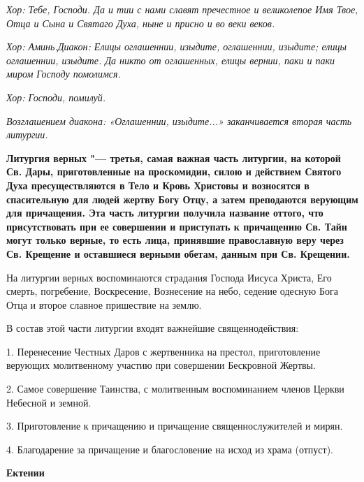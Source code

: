 \itshape Хор:\normalfont{} Тебе, Господи. Да и тии с нами славят пречестное и великолепое Имя Твое, Отца и Сына и Святаго Духа, ныне и присно и во веки веков.


\itshape Хор:\normalfont{} Аминь.\itshape  Диакон:\normalfont{} Елицы оглашеннии, изыдите, оглашеннии, изыдите; елицы оглашеннии, изыдите. Да никто от оглашенных, елицы вернии, паки и паки миром Господу помолимся.


\itshape Хор:\normalfont{} Господи, помилуй.


\itshape Возглашением диакона: «Оглашеннии, изыдите...» заканчивается вторая часть литургии.\normalfont{}

\mychapterending

 


\bfseries Литургия верных\normalfont{} "--- третья, самая важная часть литургии, на которой Св. Дары, приготовленные на проскомидии, силою и действием Святого Духа пресуществляются в Тело и Кровь Христовы и возносятся в спасительную для людей жертву Богу Отцу, а затем преподаются верующим для причащения. Эта часть литургии получила название оттого, что присутствовать при ее совершении и приступать к причащению Св. Тайн могут только верные, то есть лица, принявшие православную веру через Св. Крещение и оставшиеся верными обетам, данным при Св. Крещении.



  На литургии верных воспоминаются страдания Господа Иисуса Христа, Его смерть, погребение, Воскресение, Вознесение на небо, седение одесную Бога Отца и второе славное пришествие на землю.


\medskip


В состав этой части литургии входят важнейшие священнодействия:


  1. Перенесение Честных Даров с жертвенника на престол, приготовление верующих молитвенному участию при совершении Бескровной Жертвы.


  2. Самое совершение Таинства, с молитвенным воспоминанием членов Церкви Небесной и земной. 


  3. Приготовление к причащению и причащение священнослужителей и мирян.


  4. Благодарение за причащение и благословение на исход из храма (отпуст).


\medskip


 \bfseries Ектении\normalfont{}


